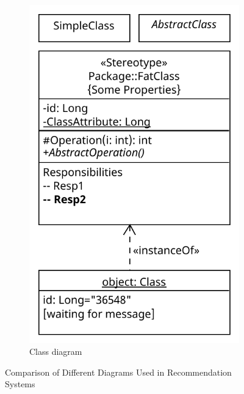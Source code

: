 \documentclass[10pt,twoside,slovak,a4paper]{article}
\begin{document}
\begin{figure}[htbp]
\begin{subfigure}[b]{0.45\textwidth}
        \includegraphics[width=\textwidth]{Diagrams/Diagram 2024-10-24 01-38-35.pdf}
        \caption{Class diagram}
        \label{fig:content_based_filtering}
    \end{subfigure}
    \caption{Comparison of Different Diagrams Used in Recommendation Systems}
    \label{fig:recommendation_systems}
\end{figure}
\end{document}
